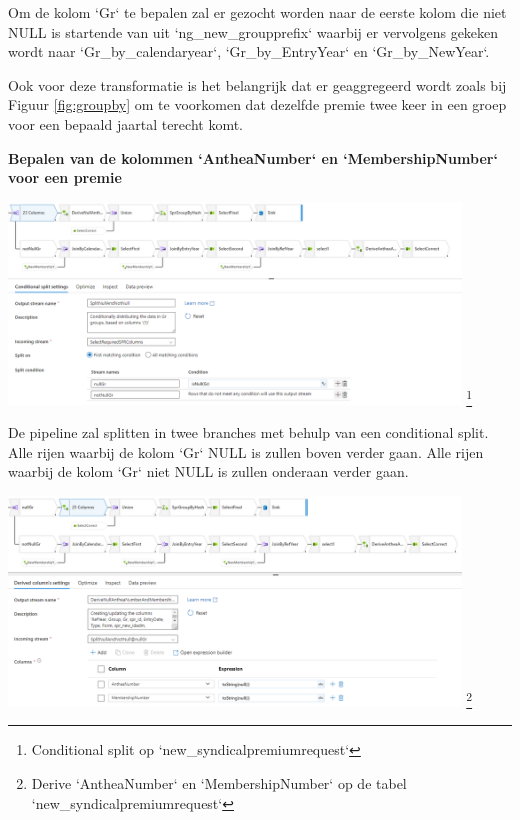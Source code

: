 Om de kolom `Gr` te bepalen zal er gezocht worden naar de eerste kolom die niet NULL is startende van uit `ng\_new\_groupprefix` waarbij er vervolgens gekeken wordt naar `Gr\_by\_calendaryear`, `Gr\_by\_EntryYear` en `Gr\_by\_NewYear`.

Ook voor deze transformatie is het belangrijk dat er geaggregeerd wordt zoals bij Figuur \ref{fig:groupby} om te voorkomen dat dezelfde premie twee keer in een groep voor een bepaald jaartal terecht komt.

\textbf{Bepalen van de kolommen `AntheaNumber` en `MembershipNumber` voor een premie}

\begin{center}
    \includegraphics[width=0.9\textwidth]{./graphics/adf/member_1.png}
    \footnote{Conditional split op `new\_syndicalpremiumrequest`}
\end{center}

De pipeline zal splitten in twee branches met behulp van een conditional split. Alle rijen waarbij de kolom `Gr` NULL is zullen boven verder gaan. Alle rijen waarbij de kolom `Gr` niet NULL is zullen onderaan verder gaan.

\begin{center}
    \includegraphics[width=0.9\textwidth]{./graphics/adf/member_2.png}
    \footnote{Derive `AntheaNumber` en `MembershipNumber` op de tabel `new\_syndicalpremiumrequest`}
\end{center}

